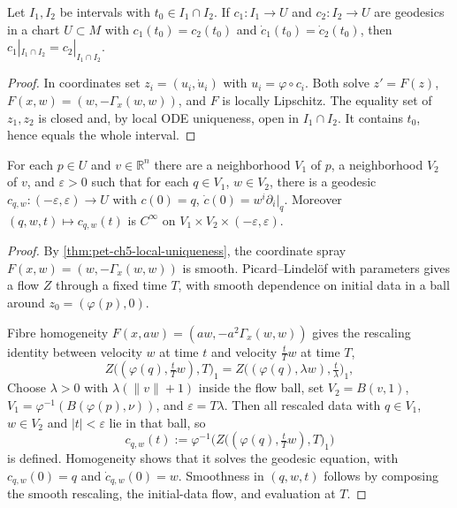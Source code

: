 \begin{theorem}
  \label{thm:pet-ch5-local-uniqueness}


  Let $I_1,I_2$ be intervals with $t_0\in I_1\cap I_2$. If $c_1:I_1\to U$ and
  $c_2:I_2\to U$ are geodesics in a chart $U\subset M$ with $c_1(t_0)=c_2(t_0)$ and
  $\dot c_1(t_0)=\dot c_2(t_0)$, then $c_1|_{I_1\cap I_2}=c_2|_{I_1\cap I_2}$.
\end{theorem}
\begin{proof}

  \sketch
  In coordinates set $z_i=(u_i,\dot u_i)$ with $u_i=\varphi\circ c_i$. Both solve
  $z'=F(z)$, $F(x,w)=(w,-\Gamma_x(w,w))$, and $F$ is locally Lipschitz. The
  equality set of $z_1,z_2$ is closed and, by local ODE uniqueness, open in
  $I_1\cap I_2$. It contains $t_0$, hence equals the whole interval.
\end{proof}

\begin{theorem}
  \label{thm:pet-ch5-local-existence}


  For each $p\in U$ and $v\in\mathbb R^n$ there are a neighborhood $V_1$ of $p$, a
  neighborhood $V_2$ of $v$, and $\varepsilon>0$ such that for each $q\in V_1$,
  $w\in V_2$, there is a geodesic $c_{q,w}:(-\varepsilon,\varepsilon)\to U$ with $c(0)=q$,
  $\dot c(0)=w^i\partial_i|_q$. Moreover $(q,w,t)\mapsto c_{q,w}(t)$ is $C^\infty$ on
  $V_1\times V_2\times(-\varepsilon,\varepsilon)$.
\end{theorem}
\begin{proof}

  \sketch
  By \cref{thm:pet-ch5-local-uniqueness}, the coordinate spray
  $F(x,w)=(w,-\Gamma_x(w,w))$ is smooth. Picard--Lindel\"of with parameters
  gives a flow $Z$ through a fixed time $T$, with smooth dependence on initial
  data in a ball around $z_0=(\varphi(p),0)$.

  Fibre homogeneity $F(x,aw)=(aw,-a^2\Gamma_x(w,w))$ gives the rescaling
  identity between velocity $w$ at time $t$ and velocity $\tfrac tT w$ at time $T$,
  \[
    Z\big((\varphi(q),\tfrac tT w),T\big)_1
      = Z\big((\varphi(q),\lambda w),\tfrac t\lambda\big)_1 ,
  \]
  Choose $\lambda>0$ with $\lambda(\lVert v\rVert+1)$ inside the flow ball,
  set $V_2=B(v,1)$, $V_1=\varphi^{-1}(B(\varphi(p),\nu))$, and
  $\varepsilon=T\lambda$. Then all rescaled data with $q\in V_1$, $w\in V_2$
  and $|t|<\varepsilon$ lie in that ball, so
  \[
    c_{q,w}(t) := \varphi^{-1}\Big(Z\big((\varphi(q),\tfrac tT w),T\big)_1\Big)
  \]
  is defined. Homogeneity shows that it solves the geodesic equation, with
  $c_{q,w}(0)=q$ and $\dot c_{q,w}(0)=w$. Smoothness in $(q,w,t)$ follows by
  composing the smooth rescaling, the initial-data flow, and evaluation at $T$.
\end{proof}

